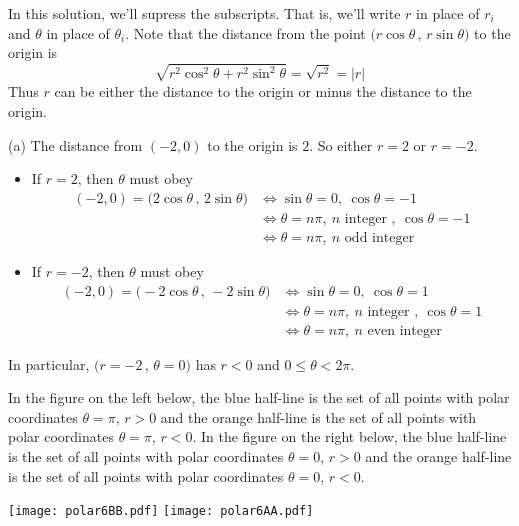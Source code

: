 \begin{solution}
In this solution, we'll supress the subscripts. That is, we'll write $r$ in place of $r_i$ and $\theta$ in place of $\theta_i$.
Note that the distance from the point $\big(r\cos\theta\,,\,r\sin\theta\big)$
to the origin is
\begin{equation*}
\sqrt{r^2\cos^2\theta + r^2\sin^2\theta}
=\sqrt{r^2}
=|r|
\end{equation*}
Thus $r$ can be either the distance to the origin or minus the distance to the
origin.

(a) 
The distance from $(-2,0)$ to the origin is $2$. So either $r=2$ or $r=-2$.
\begin{itemize}
\item If $r=2$, then $\theta$ must obey 
\begin{align*}
(-2,0) = \big(2\cos\theta\,,\,2\sin\theta\big)
&\iff \sin\theta=0,\ \cos\theta=-1 \\
&\iff \theta= n\pi,\ n\text{ integer },\ \cos\theta=-1 \\
&\iff \theta= n\pi,\ n\text{ odd integer }
\end{align*}
\item If $r=-2$, then $\theta$ must obey 
\begin{align*}
(-2,0) = \big(-2\cos\theta\,,\,-2\sin\theta\big)
&\iff \sin\theta=0,\ \cos\theta=1 \\
&\iff \theta= n\pi,\ n\text{ integer },\ \cos\theta=1 \\
&\iff \theta= n\pi,\ n\text{ even integer }
\end{align*}
\end{itemize}
In particular,  $\big(r=-2\,,\,\theta= 0\big)$ has $r<0$
    and $0\le\theta<2\pi$.

In the figure on the left below, the blue half-line is the set of all points 
with polar coordinates $\theta=\pi$, $r>0$ and the orange half-line is the set 
of all points  with polar coordinates $\theta=\pi$, $r<0$. 
In the figure on the right below, the blue half-line is the set of all points 
with polar coordinates $\theta=0$, $r>0$ and the orange half-line is the set 
of all points  with polar coordinates $\theta=0$, $r<0$. 
\begin{center}
  \texttt{[image: polar6BB.pdf]}\qquad
  \texttt{[image: polar6AA.pdf]}
\end{center}



\end{solution}
